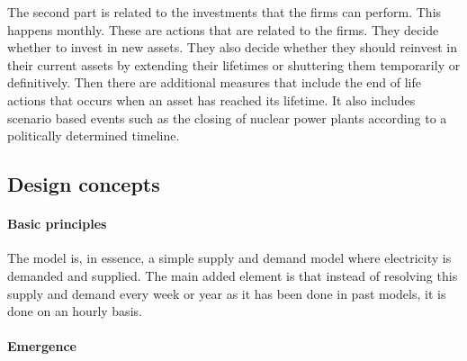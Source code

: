 The second part is related to the investments that the firms can perform. This happens monthly. These are actions that are related to the firms. They decide whether to invest in new assets. They also decide whether they should reinvest in their current assets by extending their lifetimes or shuttering them temporarily or definitively. Then there are additional measures that include the end of life actions that occurs when an asset has reached its lifetime. It also includes scenario based events such as the closing of nuclear power plants according to a politically determined timeline.


\subsection{Design concepts}
\label{ssec:design}

\paragraph{Basic principles}

The model is, in essence, a simple supply and demand model where electricity is demanded and supplied. The main added element is that instead of resolving this supply and demand every week or year as it has been done in past models, it is done on an hourly basis.

\paragraph{Emergence}

